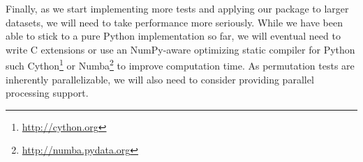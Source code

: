 Finally, as we start implementing more tests and applying our package to larger
datasets, we will need to take performance more seriously.  While we have been
able to stick to a pure Python implementation so far, we will eventual need to
write C extensions or use an NumPy-aware optimizing static compiler for Python such
Cython\footnote{\url{http://cython.org}} or
Numba\footnote{\url{http://numba.pydata.org}} to improve computation time.  As
permutation tests are inherently parallelizable, we will also need to consider
providing parallel processing support.
